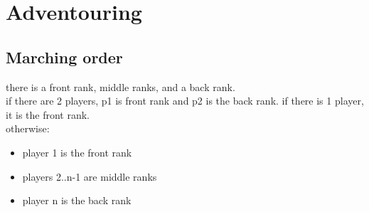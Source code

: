 \documentclass[fontsize=11pt,paper=a4,pagesize=auto,openany]{scrbook}
\begin{document}
    \chapter{Adventouring}
      \section{Marching order}
        there is a front rank, middle ranks, and a back rank.\\
        if there are 2 players, p1 is front rank and p2 is the back rank.
        if there is 1 player, it is the front rank.\\
        otherwise:
        \begin{itemize}
          \item player 1 is the front rank
          \item players 2..n-1 are middle ranks
          \item player n is the back rank
        \end{itemize}

  \printnoidxglossary[type=\acronymtype]
\end{document}
